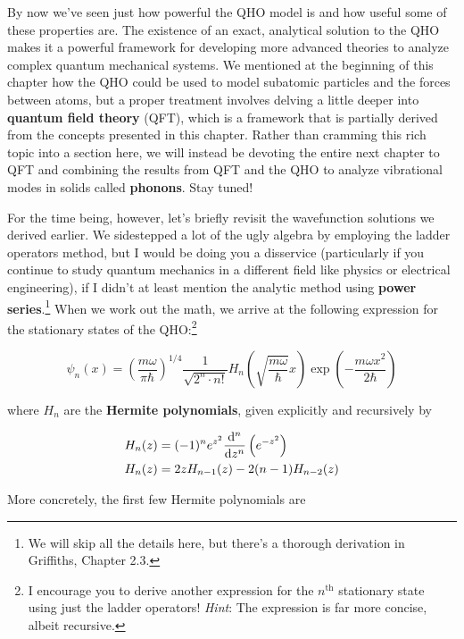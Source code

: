 By now we've seen just how powerful the QHO model is and how useful some of these properties are. 
The existence of an exact, analytical solution to the QHO makes it a powerful framework for developing more advanced theories to analyze complex quantum mechanical systems. 
We mentioned at the beginning of this chapter how the QHO could be used to model subatomic particles and the forces between atoms, but a proper treatment involves delving a little deeper into \textbf{quantum field theory} (QFT), which is a framework that is partially derived from the concepts presented in this chapter. 
Rather than cramming this rich topic into a section here, we will instead be devoting the entire next chapter to QFT and combining the results from QFT and the QHO to analyze vibrational modes in solids called \textbf{phonons}. 
Stay tuned!

For the time being, however, let's briefly revisit the wavefunction solutions we derived earlier. 
We sidestepped a lot of the ugly algebra by employing the ladder operators method, but I would be doing you a disservice (particularly if you continue to study quantum mechanics in a different field like physics or electrical engineering), if I didn't at least mention the analytic method using \textbf{power series}.\footnote{We will skip all the details here, but there's a thorough derivation in Griffiths, Chapter 2.3.} 
When we work out the math, we arrive at the following expression for the stationary states of the QHO:\footnote{I encourage you to derive another expression for the $n^{\text{th}}$ stationary state using just the ladder operators! \emph{Hint}: The expression is far more concise, albeit recursive.} 

\begin{equation}
	\psi_n(x) = \left(\frac{m\omega}{\pi\hbar}\right)^{1/4} \frac{1}{\sqrt{2^n \cdot n!}} H_n \left(\sqrt{\frac{m\omega}{\hbar}}x\right) \exp \left(-\frac{m\omega x^2}{2\hbar}\right) \label{eq:pow-qho}
\end{equation}

\noindent where $H_n$ are the \textbf{Hermite polynomials}, given explicitly and recursively by

\begin{align*}
	H_n(z) &= (-1)^n e^{z^2} \dv[n]{z} \left( e^{-z^2} \right) \\
	H_n(z) &= 2zH_{n-1}(z) - 2(n-1)H_{n-2}(z)
\end{align*}

More concretely, the first few Hermite polynomials are

